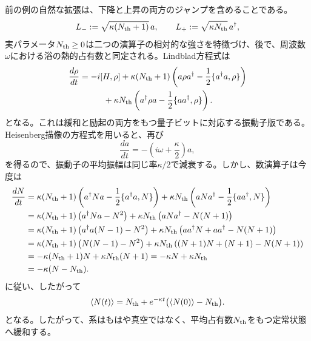 \documentclass[a4paper,11pt,oneside]{article}
\theoremstyle{definition}
\numberwithin{equation}{section}
\begin{document}
前の例の自然な拡張は、下降と上昇の両方のジャンプを含めることである。
\begin{equation}
L_- := \sqrt{\kappa(N_{\rm th}+1)}\,a ,
\qquad
L_+ := \sqrt{\kappa N_{\rm th}}\,a^\dagger ,
\end{equation}
実パラメータ$N_{\rm th}\geq 0$は二つの演算子の相対的な強さを特徴づけ、後で、周波数$\omega$における浴の熱的占有数と同定される。Lindblad方程式は
\begin{align}\label{oscthermal}
\frac{d\rho}{dt}
&=
-i[H,\rho]
+
\kappa(N_{\rm th}+1)
\left(
a\rho a^\dagger
-\frac12\{a^\dagger a,\rho\}
\right)
\nonumber\\
&\hspace{1cm}
+
\kappa N_{\rm th}
\left(
a^\dagger\rho a
-\frac12\{aa^\dagger,\rho\}
\right) .
\end{align}
となる。これは緩和と励起の両方をもつ量子ビットに対応する振動子版である。Heisenberg描像の方程式を用いると、再び
\begin{equation}
\frac{da}{dt}
=
-\left(i\omega+\frac{\kappa}{2}\right)a ,
\end{equation}
を得るので、振動子の平均振幅は同じ率$\kappa/2$で減衰する。しかし、数演算子は今度は
\begin{align}
\frac{dN}{dt}
&=
\kappa(N_{\rm th}+1)
\left(
a^\dagger N a - \frac12\{a^\dagger a,N\}
\right)
+
\kappa N_{\rm th}
\left(
a N a^\dagger - \frac12\{aa^\dagger,N\}
\right)
\nonumber\\
&=
\kappa(N_{\rm th}+1)
\left(
a^\dagger N a - N^2
\right)
+
\kappa N_{\rm th}
\left(
a N a^\dagger - N(N+1)
\right)
\nonumber\\
&=
\kappa(N_{\rm th}+1)
\left(
a^\dagger a(N-1) - N^2
\right)
+
\kappa N_{\rm th}
\left(
aa^\dagger N + aa^\dagger - N(N+1)
\right)
\nonumber\\
&=
\kappa(N_{\rm th}+1)
\left(
N(N-1)-N^2
\right)
+
\kappa N_{\rm th}
\left(
(N+1)N + (N+1) - N(N+1)
\right)
\nonumber\\
&=
-\kappa(N_{\rm th}+1)N+\kappa N_{\rm th}(N+1)
=
-\kappa N+\kappa N_{\rm th}
\nonumber\\
&=
-\kappa (N-N_{\rm th}) .
\end{align}
に従い、したがって
\begin{equation}
\langle N(t)\rangle
=
N_{\rm th}
+
e^{-\kappa t}\bigl(\langle N(0)\rangle-N_{\rm th}\bigr) .
\end{equation}
となる。したがって、系はもはや真空ではなく、平均占有数$N_{\rm th}$をもつ定常状態へ緩和する。
\end{document}
